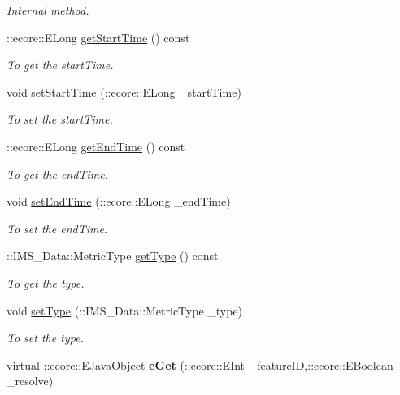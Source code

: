 \begin{DoxyCompactItemize}
\begin{DoxyCompactList}\small\item\em Internal method. \item\end{DoxyCompactList}\item 
::ecore::ELong \hyperlink{classIMS__Data_1_1MetricHistOp_a2e0dce277969dd6895daef7b660a041f}{getStartTime} () const 
\begin{DoxyCompactList}\small\item\em To get the startTime. \item\end{DoxyCompactList}\item 
void \hyperlink{classIMS__Data_1_1MetricHistOp_ae2e92f33358b2c6d5badf109f2951a5f}{setStartTime} (::ecore::ELong \_\-startTime)
\begin{DoxyCompactList}\small\item\em To set the startTime. \item\end{DoxyCompactList}\item 
::ecore::ELong \hyperlink{classIMS__Data_1_1MetricHistOp_a028ba769d7fd35a0c8a087ead8732b1c}{getEndTime} () const 
\begin{DoxyCompactList}\small\item\em To get the endTime. \item\end{DoxyCompactList}\item 
void \hyperlink{classIMS__Data_1_1MetricHistOp_a1009704165a925ef5b48f4542bfef706}{setEndTime} (::ecore::ELong \_\-endTime)
\begin{DoxyCompactList}\small\item\em To set the endTime. \item\end{DoxyCompactList}\item 
::IMS\_\-Data::MetricType \hyperlink{classIMS__Data_1_1MetricHistOp_a263f53b509afa876b741559e2d78e80e}{getType} () const 
\begin{DoxyCompactList}\small\item\em To get the type. \item\end{DoxyCompactList}\item 
void \hyperlink{classIMS__Data_1_1MetricHistOp_a0beb497f1d517fcf4ef8f778910d14fc}{setType} (::IMS\_\-Data::MetricType \_\-type)
\begin{DoxyCompactList}\small\item\em To set the type. \item\end{DoxyCompactList}\item 
\hypertarget{classIMS__Data_1_1MetricHistOp_aa6fe8ed9a4122ec316666e12c1872d86}{
virtual ::ecore::EJavaObject {\bfseries eGet} (::ecore::EInt \_\-featureID,::ecore::EBoolean \_\-resolve)}
\label{classIMS__Data_1_1MetricHistOp_aa6fe8ed9a4122ec316666e12c1872d86}


\end{DoxyCompactItemize}
